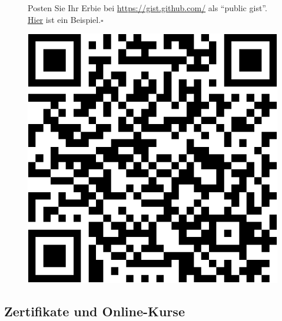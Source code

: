 \documentclass[
  letterpaper,
]{scrbook}
\theoremstyle{definition}
\theoremstyle{definition}
\theoremstyle{definition}
\theoremstyle{remark}
\begin{document}
\begin{tcolorbox}[enhanced jigsaw, left=2mm, toptitle=1mm, toprule=.15mm, rightrule=.15mm, leftrule=.75mm, breakable, colbacktitle=quarto-callout-tip-color!10!white, colback=white, coltitle=black, bottomtitle=1mm, opacityback=0, title=\textcolor{quarto-callout-tip-color}{\faLightbulb}\hspace{0.5em}{Tipp}, colframe=quarto-callout-tip-color-frame, arc=.35mm, opacitybacktitle=0.6, bottomrule=.15mm, titlerule=0mm]

\begin{figure}[H]

\begin{minipage}{0.80\linewidth}
Posten Sie Ihr Erbie bei \url{https://gist.github.com/} als ``public
gist''.
\href{https://gist.github.com/sebastiansauer/0649a0453b5cc7c6a1d16ac760667215}{Hier}
ist ein Beispiel.\(\square\)\end{minipage}%
%
\begin{minipage}{0.20\linewidth}

\begin{center}
\includegraphics[width=0.75\linewidth,height=\textheight,keepaspectratio]{030-aufbereiten_files/figure-pdf/unnamed-chunk-49-1.pdf}
\end{center}

\end{minipage}%

\end{figure}%

\end{tcolorbox}

\subsection{Zertifikate und
Online-Kurse}\label{zertifikate-und-online-kurse}
\end{document}
